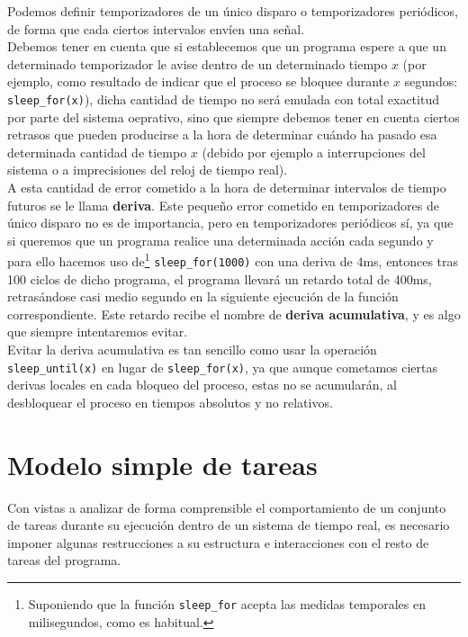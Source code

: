Podemos definir temporizadores de un único disparo o temporizadores periódicos, de forma que cada ciertos intervalos envíen una señal.\\

Debemos tener en cuenta que si establecemos que un programa espere a que un determinado temporizador le avise dentro de un determinado tiempo $x$ (por ejemplo, como resultado de indicar que el proceso se bloquee durante $x$ segundos: \verb|sleep_for(x)|), dicha cantidad de tiempo no será emulada con total exactitud por parte del sistema oeprativo, sino que siempre debemos tener en cuenta ciertos retrasos que pueden producirse a la hora de determinar cuándo ha pasado esa determinada cantidad de tiempo $x$ (debido por ejemplo a interrupciones del sistema o a imprecisiones del reloj de tiempo real).\\

A esta cantidad de error cometido a la hora de determinar intervalos de tiempo futuros se le llama \textbf{deriva}. Este pequeño error cometido en temporizadores de único disparo no es de importancia, pero en temporizadores periódicos sí, ya que si queremos que un programa realice una determinada acción cada segundo y para ello hacemos uso de\footnote{Suponiendo que la función \texttt{sleep\_for} acepta las medidas temporales en milisegundos, como es habitual.} \verb|sleep_for(1000)| con una deriva de 4ms, entonces tras 100 ciclos de dicho programa, el programa llevará un retardo total de 400ms, retrasándose casi medio segundo en la siguiente ejecución de la función correspondiente. Este retardo recibe el nombre de \textbf{deriva acumulativa}, y es algo que siempre intentaremos evitar.\\

Evitar la deriva acumulativa es tan sencillo como usar la operación \verb|sleep_until(x)| en lugar de \verb|sleep_for(x)|, ya que aunque cometamos ciertas derivas locales en cada bloqueo del proceso, estas no se acumularán, al desbloquear el proceso en tiempos absolutos y no relativos.

\section{Modelo simple de tareas}
Con vistas a analizar de forma comprensible el comportamiento de un conjunto de tareas durante su ejecución dentro de un sistema de tiempo real, es necesario imponer algunas restrucciones a su estructura e interacciones con el resto de tareas del programa.\\

